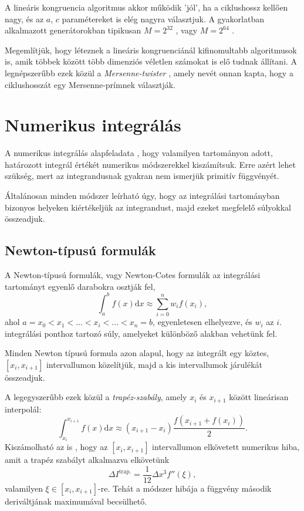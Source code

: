 \documentclass[12pt]{article}
\theoremstyle{plain}
\begin{document}
A lineáris kongruencia algoritmus akkor működik 'jól', ha a ciklushossz kellően nagy, és az $a$, $c$ paramétereket is elég nagyra választjuk. A gyakorlatban alkalmazott generátorokban tipikusan $M=2^{32}$ \cite{numrecipes}, vagy $M=2^{64}$ \cite{knuth}. 

Megemlítjük, hogy léteznek a lineáris kongruenciánál kifinomultabb algoritmusok is, amik többek között több dimenziós véletlen számokat is elő tudnak állítani. A legnépszerűbb ezek közül a {\em Mersenne-twister} \cite{random}, amely nevét onnan kapta, hogy a ciklushosszát egy Mersenne-prímnek választják.  
\section{Numerikus integrálás}
A numerikus integrálás alapfeladata \cite{landau}, hogy valamilyen tartományon adott, határozott integrál értékét numerikus módszerekkel kiszámítsuk. Erre azért lehet szükség, mert az integrandusnak gyakran nem ismerjük primitív függvényét. 

Általánosan minden módszer leírható úgy, hogy az integrálási tartományban bizonyos helyeken kiértékeljük az integrandust, majd ezeket megfelelő súlyokkal összeadjuk. 
\subsection{Newton-típusú formulák}
A Newton-típusú formulák, vagy Newton-Cotes formulák az integrálási tartományt egyenlő darabokra osztják fel,
\begin{equation}
    \label{nc}
    \int_a^b f(x) \text{d}x  \approx \sum_{i=0}^n w_i f(x_i),
\end{equation}
ahol $a = x_0 < x_1 < ... < x_i < ... < x_n=b$, egyenletesen elhelyezve, és $w_i$ az $i$. integrálási ponthoz tartozó súly, amelyeket különböző alakban vehetünk fel. 

Minden Newton típusú formula azon alapul, hogy az integrált egy köztes, $[x_i, x_{i+1}]$ intervallumon közelítjük, majd a kis intervallumok járulékát összeadjuk. 

A legegyszerűbb ezek közül a {\em trapéz-szabály}, amely $x_i$ és $x_{i+1}$ között lineárisan interpolál:
\begin{equation}
    \label{trap}
    \int_{x_{i}}^{x_{i+1}} f(x) \text{d}x \approx (x_{i+1} - x_i) \frac{f(x_{i+1} + f(x_i))}{2}.
\end{equation}
Kiszámolható az is \cite{error}, hogy az $[x_i, x_{i+1}]$ intervallumon elkövetett numerikus hiba, amit a trapéz szabályt alkalmazva elkövetünk
$$
\Delta I ^{\text{trap.}} = \frac{1}{12}\Delta x^3 f''(\xi),
$$
valamilyen $\xi \in [x_i, x_{i+1}]$-re. Tehát a módszer hibája a függvény második deriváltjának maximumával becsülhető.
\end{document}
